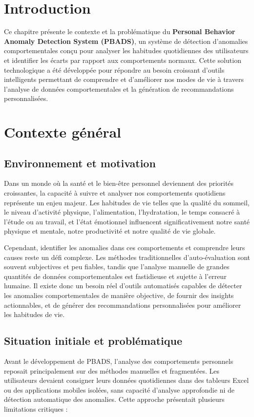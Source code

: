 \section{Introduction}
Ce chapitre présente le contexte et la problématique du \textbf{Personal Behavior Anomaly Detection System (PBADS)}, un système de détection d'anomalies comportementales conçu pour analyser les habitudes quotidiennes des utilisateurs et identifier les écarts par rapport aux comportements normaux. Cette solution technologique a été développée pour répondre au besoin croissant d'outils intelligents permettant de comprendre et d'améliorer nos modes de vie à travers l'analyse de données comportementales et la génération de recommandations personnalisées.

\section{Contexte général}

\subsection{Environnement et motivation}
Dans un monde où la santé et le bien-être personnel deviennent des priorités croissantes, la capacité à suivre et analyser nos comportements quotidiens représente un enjeu majeur. Les habitudes de vie telles que la qualité du sommeil, le niveau d'activité physique, l'alimentation, l'hydratation, le temps consacré à l'étude ou au travail, et l'état émotionnel influencent significativement notre santé physique et mentale, notre productivité et notre qualité de vie globale.

Cependant, identifier les anomalies dans ces comportements et comprendre leurs causes reste un défi complexe. Les méthodes traditionnelles d'auto-évaluation sont souvent subjectives et peu fiables, tandis que l'analyse manuelle de grandes quantités de données comportementales est fastidieuse et sujette à l'erreur humaine. Il existe donc un besoin réel d'outils automatisés capables de détecter les anomalies comportementales de manière objective, de fournir des insights actionnables, et de générer des recommandations personnalisées pour améliorer les habitudes de vie.

\subsection{Situation initiale et problématique}
Avant le développement de PBADS, l'analyse des comportements personnels reposait principalement sur des méthodes manuelles et fragmentées. Les utilisateurs devaient consigner leurs données quotidiennes dans des tableurs Excel ou des applications mobiles isolées, sans capacité d'analyse approfondie ni de détection automatique des anomalies. Cette approche présentait plusieurs limitations critiques :

